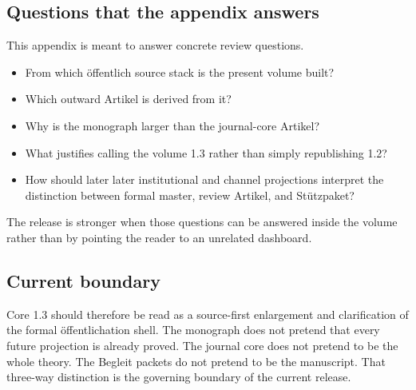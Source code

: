 \subsection{Questions that the appendix answers}

This appendix is meant to answer concrete review questions.

\begin{itemize}
\item From which öffentlich source stack is the present volume built?
\item Which outward Artikel is derived from it?
\item Why is the monograph larger than the journal-core Artikel?
\item What justifies calling the volume 1.3 rather than simply republishing 1.2?
\item How should later later institutional and channel projections interpret the distinction between formal
      master, review Artikel, and Stützpaket?
\end{itemize}

The release is stronger when those questions can be answered inside the volume rather than by
pointing the reader to an unrelated dashboard.

\subsection{Current boundary}

Core 1.3 should therefore be read as a source-first enlargement and clarification of the formal
öffentlichation shell.
The monograph does not pretend that every future projection is already proved.
The journal core does not pretend to be the whole theory.
The Begleit packets do not pretend to be the manuscript.
That three-way distinction is the governing boundary of the current release.

\clearpage
